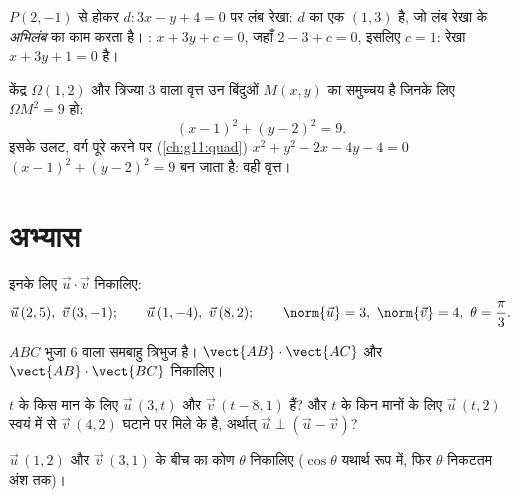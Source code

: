 \begin{example}\label{ex:g11:scal:perpline}
$P(2, -1)$ से होकर $d : 3x - y + 4 = 0$ पर लंब रेखा: $d$ का एक  $(1, 3)$ है, जो लंब रेखा
के \emph{अभिलंब}  का काम करता है। : $x + 3y + c = 0$, जहाँ $2 - 3 + c = 0$, इसलिए
$c = 1$: रेखा $x + 3y + 1 = 0$ है।
\end{example}

\begin{example}[वृत्त का समीकरण]\label{ex:g11:scal:circle}
केंद्र $\Omega(1, 2)$ और त्रिज्या $3$ वाला वृत्त उन बिंदुओं $M(x,y)$ का समुच्चय है
जिनके लिए $\Omega M^2 = 9$ हो:
\[
(x - 1)^2 + (y - 2)^2 = 9 .
\]
इसके उलट, वर्ग पूरे करने पर (\cref{ch:g11:quad}) $x^2 + y^2 - 2x - 4y - 4 = 0$ $(x-1)^2 + (y-2)^2 = 9$ बन जाता है: वही वृत्त।
\end{example}

\section{अभ्यास}

\begin{exercise}[$\star$]\label{exo:g11:scal:1}
इनके लिए $\vec u \cdot \vec v$ निकालिए:
\[
\vec u\,(2, 5),\ \vec v\,(3, -1); \qquad
\vec u\,(1, -4),\ \vec v\,(8, 2); \qquad
\norm{\vec u} = 3,\ \norm{\vec v} = 4,\ \theta = \frac{\pi}{3} .
\]
\end{exercise}

\begin{exercise}[$\star$]\label{exo:g11:scal:2}
$ABC$ भुजा $6$ वाला समबाहु त्रिभुज है। $\vect{AB} \cdot \vect{AC}$ और $\vect{AB} \cdot \vect{BC}$ निकालिए।
\end{exercise}

\begin{exercise}[$\star$]\label{exo:g11:scal:3}
$t$ के किस मान के लिए $\vec u\,(3, t)$ और $\vec v\,(t - 8, 1)$  हैं? और $t$ के किन मानों के
लिए $\vec u\,(t, 2)$ स्वयं में से $\vec v\,(4, 2)$ घटाने पर मिले  के  है, अर्थात् $\vec u \perp (\vec u - \vec v)$?
\end{exercise}

\begin{exercise}[$\star$]\label{exo:g11:scal:4}
$\vec u\,(1, 2)$ और $\vec v\,(3, 1)$ के बीच का कोण $\theta$ निकालिए ($\cos\theta$ यथार्थ रूप में, फिर $\theta$
निकटतम अंश तक)।
\end{exercise}

